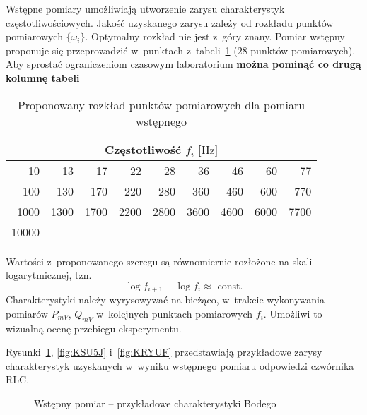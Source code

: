 \documentclass[paper=a4,DIV=12]{lpas}
\begin{document}
\begin{appendices}
  Wstępne pomiary umożliwiają utworzenie zarysu charakterystyk
  częstotliwościowych. Jakość uzyskanego zarysu zależy od rozkładu punktów
  pomiarowych $\{\omega_i\}$. Optymalny rozkład nie jest z~góry znany. Pomiar
  wstępny proponuje się przeprowadzić w~punktach z~tabeli~\ref{tab:D3Y3O} ($28$
  punktów pomiarowych). Aby sprostać ograniczeniom czasowym laboratorium
  \textbf{można pominąć co drugą kolumnę tabeli}
  \begin{table}[H]
    \centering
    \begin{tabular}{|r|r|r|r|r|r|r|r|r|}
      \hline
      \multicolumn{9}{|c|}{Częstotliwość $f_i\text{ [Hz]}$} \\
      \hline\hline
      10 &    13 &    17 &    22 &    28 &    36 &    46 &    60 &    77 \\
      100 &   130 &   170 &   220 &   280 &   360 &   460 &   600 &   770 \\
      1000 &  1300 &  1700 &  2200 &  2800 &  3600 &  4600 &  6000 &  7700 \\
      10000 &       &       &       &       &       &       &       & \\\hline
    \end{tabular}
    \caption{Proponowany rozkład punktów pomiarowych dla pomiaru wstępnego}
    \label{tab:D3Y3O}
  \end{table}
  Wartości z~proponowanego szeregu są równomiernie rozłożone na skali
  logarytmicznej, tzn.
  \begin{equation}
    \log{f_{i+1}} - \log{f_i} \approx \text{ const}.
    \label{eq:I4BBA}
  \end{equation}
  Charakterystyki należy wyrysowywać na bieżąco, w~trakcie wykonywania pomiarów
  $P_{mV}$, $Q_{mV}$ w~kolejnych punktach pomiarowych $f_i$. Umożliwi to
  wizualną ocenę przebiegu eksperymentu.

  Rysunki~\ref{fig:P2GUQ}, \ref{fig:KSU5J} i~\ref{fig:KRYUF} przedstawiają
  przykładowe zarysy charakterystyk uzyskanych w~wyniku wstępnego pomiaru
  odpowiedzi czwórnika RLC.
  \begin{figure}[H]
    \centering
    
    \caption{Wstępny pomiar -- przykładowe charakterystyki Bodego}
    \label{fig:P2GUQ}
  \end{figure}


\end{appendices}
\end{document}
